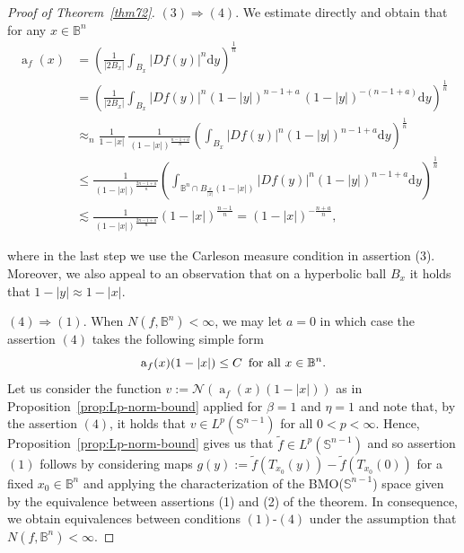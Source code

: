 \documentclass[11pt,a4paper,reqno]{amsart}
\theoremstyle{definition}
\def\vint{\mathop{\mathchoice%
          {\setbox0\hbox{$\displaystyle\intop$}\kern 0.22\wd0%
           \vcenter{\hrule width 0.6\wd0}\kern -0.82\wd0}%
          {\setbox0\hbox{$\textstyle\intop$}\kern 0.2\wd0%
           \vcenter{\hrule width 0.6\wd0}\kern -0.8\wd0}%
          {\setbox0\hbox{$\scriptstyle\intop$}\kern 0.2\wd0%
           \vcenter{\hrule width 0.6\wd0}\kern -0.8\wd0}%
          {\setbox0\hbox{$\scriptscriptstyle\intop$}\kern 0.2\wd0%
           \vcenter{\hrule width 0.6\wd0}\kern -0.8\wd0}}%
          \mathopen{}\int}
\renewcommand{\a}{\operatorname{a}}
\newcommand{\om}{\omega}
\newcommand{\B}{\mathbb{B}^n}
\newcommand{\Nm}{\mathcal{N}}
\newcommand{\ud}{\mathrm {d}}
\newcommand{\Sn}{\mathbb{S}^{n-1}}
\numberwithin{komcounter}{section}
\begin{document}
\begin{proof}[Proof of Theorem~\ref{thm72}]
\noindent $(3)\Rightarrow (4)$. We estimate directly and obtain that for any $x\in \B$
\begin{align*}
\a_f(x) & = \left(\frac{1}{|2B_x|} \int_{B_x}|Df(y)|^n \ud y\right)^{\frac1n}  \\
& = \left(\frac{1}{|2B_x|} \int_{B_x}|Df(y)|^{n} (1-|y|)^{n-1+a}\,(1-|y|)^{-(n-1+a)} \ud y\right)^{\frac{1}{n}} \\
& \approx_{n} \frac{1}{1-|x|}\,\frac{1}{\,(1-|x|)^{\frac{n-1+a}{n}}} \left(\int_{B_x}|Df(y)|^{n} (1-|y|)^{n-1+a}\ud y\right)^{\frac{1}{n}} \\
& \leq \frac{1}{\,(1-|x|)^{\frac{2n-1+a}{n}}} \left(\int_{\B\cap B_{\frac{x}{|x|}}(1-|x|)}|Df(y)|^{n} (1-|y|)^{n-1+a} \ud y\right)^{\frac{1}{n}} \\
& \lesssim \frac{1}{\,(1-|x|)^{\frac{2n-1+a}{n}}} (1-|x|)^{\frac{n-1}{n}}=(1-|x|)^{-\frac{n+a}{n}},
\end{align*}

where in the last step we use the Carleson measure condition in assertion (3). Moreover, we also appeal to an observation that on a hyperbolic ball $B_x$ it holds that $1-|y|\approx 1-|x|$.
\smallskip

\noindent $(4)\Rightarrow (1)$. When $N(f, \B)<\infty$, we may let $a=0$ in which case the assertion $(4)$ takes the following simple form 
\begin{equation}\label{assert4-a-zero}
\a_f(x) (1-|x|)\leq C\, \hbox{ for all } x\in\B.
\end{equation}
Let us consider the function $v:=\Nm(\a_f(x) (1-|x|))$ as in Proposition~\ref{prop:Lp-norm-bound} applied for $\beta=1$ and $\eta=1$ and note that, by the assertion $(4)$, it holds that $v\in L^p(\Sn)$ for all $0<p<\infty$. Hence, Proposition~\ref{prop:Lp-norm-bound} gives us that $\tilde{f}\in L^p(\Sn)$ and so assertion $(1)$ follows by considering maps $g(y):=\tilde{f}(T_{x_0}(y))-\tilde{f}(T_{x_0}(0))$ for a fixed $x_0\in \B$ and applying the characterization of the BMO($\Sn$) space given by the equivalence between assertions (1) and (2) of the theorem. In consequence, we obtain equivalences between conditions $(1)$-$(4)$ under the assumption that $N(f, \B)<\infty$.
\smallskip


\end{proof}
\end{document}
